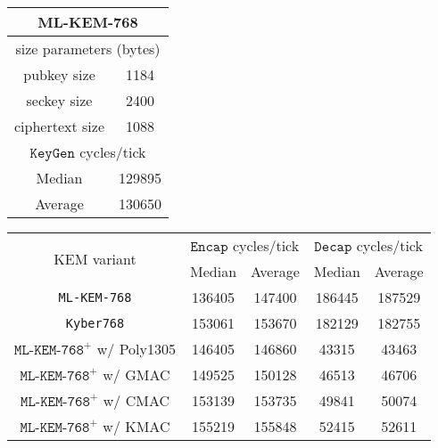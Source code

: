 \documentclass[journal=tches,submission]{iacrtrans}
\newcommand{\keygen}{\texttt{KeyGen}}
\newcommand{\encap}{\texttt{Encap}}
\newcommand{\decap}{\texttt{Decap}}
\begin{document}
\begin{table}[h]
    \begin{tabular}[t]{|cc|}
        \hline
        \multicolumn{2}{|c|}{\bf ML-KEM-768} \\
        \hline
        \multicolumn{2}{|c|}{size parameters (bytes)} \\
        pubkey size & 1184 \\
        seckey size & 2400 \\
        ciphertext size & 1088 \\
        \hline
        \multicolumn{2}{|c|}{$\keygen$ cycles/tick} \\
        Median & 129895 \\
        Average & 130650 \\
        \hline
    \end{tabular}
    \begin{tabular}[t]{|c|c|c|c|c|}
        \hline
        \multirow{2}{*}{KEM variant} 
        & \multicolumn{2}{|c|}{$\encap$ cycles/tick} 
        & \multicolumn{2}{|c|}{$\decap$ cycles/tick} \\
        \cline{2-5}
        & Median & Average & Median & Average \\
        \hline
        \texttt{ML-KEM-768} & 136405 & 147400 & 186445 & 187529 \\
        \hline
        \texttt{Kyber768} & 153061 & 153670 & 182129 & 182755 \\
        \hline
        $\texttt{ML-KEM-768}^+$ w/ Poly1305 & 146405 & 146860 & 43315 & 43463 \\
        \hline
        $\texttt{ML-KEM-768}^+$ w/ GMAC & 149525 & 150128 & 46513 & 46706 \\
        \hline
        $\texttt{ML-KEM-768}^+$ w/ CMAC & 153139 & 153735 & 49841 & 50074 \\
        \hline
        $\texttt{ML-KEM-768}^+$ w/ KMAC & 155219 & 155848 & 52415 & 52611 \\
        \hline
    \end{tabular}\vspace{0.3cm}


\end{table}
\end{document}

